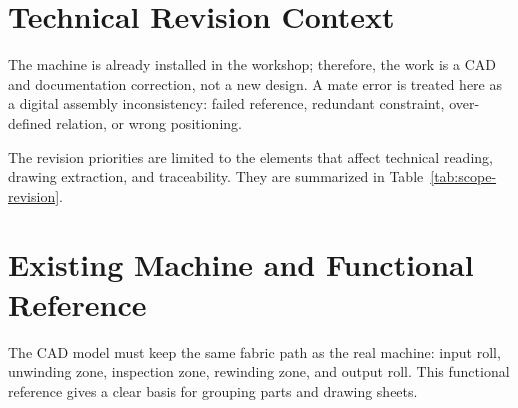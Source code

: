 \section{Technical Revision Context}

The machine is already installed in the workshop; therefore, the work is a CAD and documentation correction, not a new design. A mate error is treated here as a digital assembly inconsistency: failed reference, redundant constraint, over-defined relation, or wrong positioning.

The revision priorities are limited to the elements that affect technical reading, drawing extraction, and traceability. They are summarized in Table~\ref{tab:scope-revision}.

\begin{table}[H]
\centering
\small
\caption{Scope of the technical revision}
\label{tab:chapter2-2}
\end{table}

\section{Existing Machine and Functional Reference}

The CAD model must keep the same fabric path as the real machine: input roll, unwinding zone, inspection zone, rewinding zone, and output roll. This functional reference gives a clear basis for grouping parts and drawing sheets.


